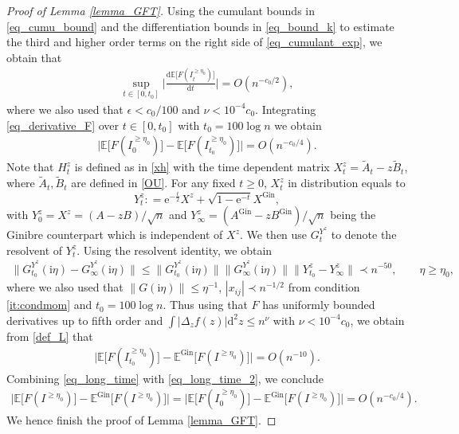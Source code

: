 \documentclass[10pt,reqno]{amsart}
\newcommand{\A}{{\tilde{A}}}
\newcommand{\B}{{\tilde{B}}}
\newcommand{\II}{I^{\geq \eta_0}} %
\newcommand{\dd}{\mathrm{d}}
\newcommand{\ii}{\mathrm{i}}
\newcommand{\<}{\langle}
\renewcommand{\>}{\rangle}
\numberwithin{equation}{section}
\begin{document}
\begin{proof}[Proof of Lemma \ref{lemma_GFT}]
Using the cumulant bounds in \eqref{eq_cumu_bound} and the differentiation bounds in \eqref{eq_bound_k} to estimate the third and higher order terms on the right side of \eqref{eq_cumulant_exp}, we obtain that
\begin{align}\label{eq_derivative_F}
	\sup_{t\in[0,t_0]} \Big|\frac{\dd \mathbb{E}\big[ F(\II_t)\big]}{\dd t} \Big| =O(n^{-c_0/2}),
\end{align}
where we also used that $\epsilon<c_0/100$ and $\nu<10^{-4}c_0$. Integrating \eqref{eq_derivative_F} over $t \in [0, t_0]$ with $t_0=100\log n$ we obtain 
\begin{align}\label{eq_long_time}
	\Big| \mathbb{E}\big[ F(\II_0)\big]-\mathbb{E}\big[ F(\II_{t_0})\big] \Big| =O(n^{-c_0/4}). 
\end{align}
Note that $H^z_{t}$ is defined as in \eqref{xh} with the time dependent matrix $X^z_t=\A_t-z \B_t$, where $\A_t,\B_t$ are defined in \eqref{OU}. For any fixed $t\ge 0$, $X^z_t$ in distribution equals to
$$Y^z_t :{=} \mathrm{e}^{-\frac{t}{2}} X^z+\sqrt{1-\mathrm{e}^{-t}} X^{\mathrm{Gin}},$$
with $Y^z_0=X^z=(A-zB)/\sqrt{n}$ and $Y^z_\infty=(A^{\mathrm{Gin}}-zB^{\mathrm{Gin}})/\sqrt{n}$ being the Ginibre counterpart which is independent of $X^z$. We then use $G_t^{Y^z}$ to denote the resolvent of $Y_t^z$. Using the resolvent identity, we obtain
\begin{align}\label{eq_final}
	\|G^{Y^z}_{t_0}(\ii \eta)-G^{Y^z}_{\infty}(\ii \eta)\| \leq \|G^{Y^z}_{t_0}(\ii \eta)\| \|G^{Y^z}_{\infty}(\ii \eta)\| \|Y^z_{t_0}-Y^z_{\infty}\| 
	\prec n^{-50}, \qquad \eta \geq \eta_0,
\end{align}
where we also used that $\|G(\ii \eta)\| \leq \eta^{-1}$, $|x_{ij}| \prec n^{-1/2}$ from condition \ref{it:condmom} and $t_0=100\log n$. Thus using that $F$ has uniformly bounded derivatives up to fifth order and $\int|\Delta_z f(z)| \dd^2 z  \leq n^{\nu}$ with $\nu<10^{-4}c_0$,  we obtain from \eqref{def_L} that
\begin{align}\label{eq_long_time_2}
	\Big| \mathbb{E}\big[ F(\II_{t_0})\big]-\mathbb{E}^{\mathrm{Gin}}\big[ F(\II)\big] \Big| =O(n^{-10}). 
\end{align}
Combining \eqref{eq_long_time} with \eqref{eq_long_time_2}, we conclude
\begin{align}
	\Big| \mathbb{E}\big[ F(\II)\big]-\mathbb{E}^{\mathrm{Gin}}\big[ F(\II)\big] \Big|=\Big| \mathbb{E}\big[ F(\II_0)\big]-\mathbb{E}^{\mathrm{Gin}}\big[ F(\II)\big] \Big| =O(n^{-c_0/4}). 
\end{align}
We hence finish the proof of Lemma \ref{lemma_GFT}.	
\end{proof}
\end{document}
